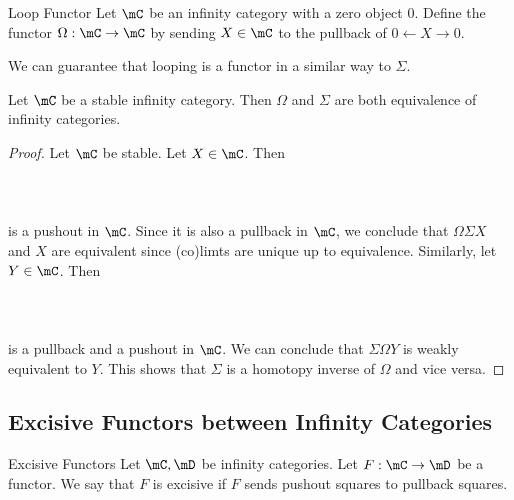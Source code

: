 \documentclass[a4paper]{article}
\begin{document}
\begin{defn}{Loop Functor}{} Let $\mC$ be an infinity category with a zero object $0$. Define the functor $\Omega:\mC\to\mC$ by sending $X\in\mC$ to the pullback of $0\leftarrow X\rightarrow0$. 
\end{defn}

We can guarantee that looping is a functor in a similar way to $\Sigma$. 

\begin{prp}{}{} Let $\mC$ be a stable infinity category. Then $\Omega$ and $\Sigma$ are both equivalence of infinity categories. \tcbline
\begin{proof}
Let $\mC$ be stable. Let $X\in\mC$. Then \\~\\
\\~\\
is a pushout in $\mC$. Since it is also a pullback in $\mC$, we conclude that $\Omega\Sigma X$ and $X$ are equivalent since (co)limts are unique up to equivalence. Similarly, let $Y\in\mC$. Then \\~\\
\\~\\
is a pullback and a pushout in $\mC$. We can conclude that $\Sigma\Omega Y$ is weakly equivalent to $Y$. This shows that $\Sigma$ is a homotopy inverse of $\Omega$ and vice versa. 
\end{proof}
\end{prp}

\subsection{Excisive Functors between Infinity Categories}
\begin{defn}{Excisive Functors}{} Let $\mC,\mD$ be infinity categories. Let $F:\mC\to\mD$ be a functor. We say that $F$ is excisive if $F$ sends pushout squares to pullback squares. 
\end{defn}
\end{document}
